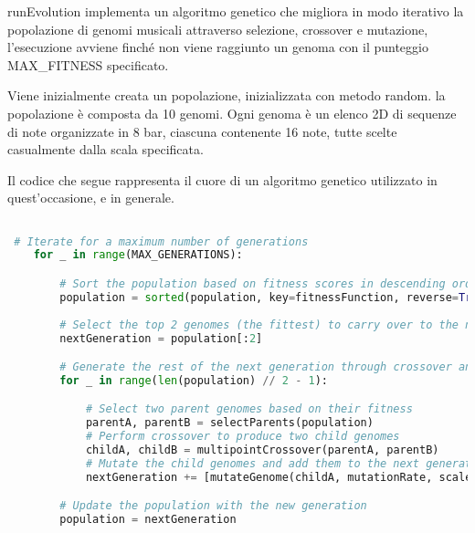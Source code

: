 \documentclass[a4paper,12pt]{report}
\begin{document}
runEvolution implementa un algoritmo genetico che migliora in modo iterativo la popolazione di genomi musicali attraverso selezione, crossover e mutazione, l'esecuzione avviene finché non viene raggiunto un genoma con il punteggio MAX_FITNESS specificato.

Viene inizialmente creata un popolazione, inizializzata con metodo random. la popolazione è composta da 10 genomi. Ogni genoma è un elenco 2D di sequenze di note organizzate in 8 bar, ciascuna contenente 16 note, tutte scelte casualmente dalla scala specificata.

Il codice che segue rappresenta il cuore di un algoritmo genetico utilizzato in quest'occasione, e in generale.

\begin{lstlisting}[language=Python]

 # Iterate for a maximum number of generations
    for _ in range(MAX_GENERATIONS):

        # Sort the population based on fitness scores in descending order
        population = sorted(population, key=fitnessFunction, reverse=True)
        
        # Select the top 2 genomes (the fittest) to carry over to the next generation
        nextGeneration = population[:2]

        # Generate the rest of the next generation through crossover and mutation
        for _ in range(len(population) // 2 - 1):

            # Select two parent genomes based on their fitness
            parentA, parentB = selectParents(population)
            # Perform crossover to produce two child genomes
            childA, childB = multipointCrossover(parentA, parentB)
            # Mutate the child genomes and add them to the next generation
            nextGeneration += [mutateGenome(childA, mutationRate, scale), mutateGenome(childB, mutationRate, scale)]

        # Update the population with the new generation
        population = nextGeneration
        
\end{lstlisting}
\end{document}
